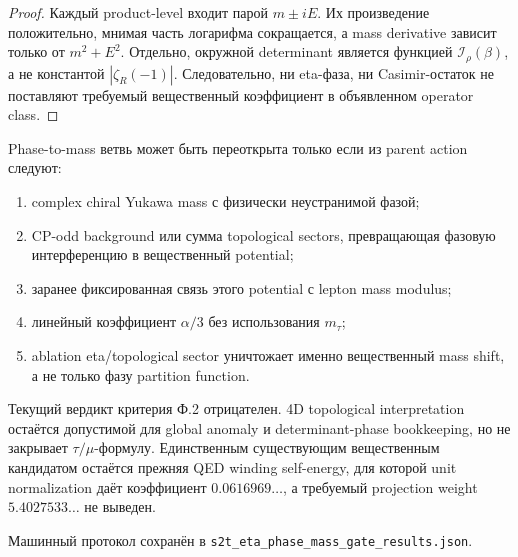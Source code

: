 \begin{proof}
Каждый product-level входит парой \(m\pm iE\). Их произведение положительно,
мнимая часть логарифма сокращается, а mass derivative зависит только от
\(m^2+E^2\). Отдельно, окружной determinant является функцией
\(\mathcal I_\rho(\beta)\), а не константой \(|\zeta_R(-1)|\). Следовательно,
ни eta-фаза, ни Casimir-остаток не поставляют требуемый вещественный
коэффициент в объявленном operator class.
\end{proof}

\begin{protocol}
Phase-to-mass ветвь может быть переоткрыта только если из parent action
следуют:
\begin{enumerate}
 \item complex chiral Yukawa mass с физически неустранимой фазой;
 \item CP-odd background или сумма topological sectors, превращающая
 фазовую интерференцию в вещественный potential;
 \item заранее фиксированная связь этого potential с lepton mass modulus;
 \item линейный коэффициент \(\alpha/3\) без использования \(m_\tau\);
 \item ablation eta/topological sector уничтожает именно вещественный mass
 shift, а не только фазу partition function.
\end{enumerate}
\end{protocol}

Текущий вердикт критерия Ф.2 отрицателен. 4D topological interpretation
остаётся допустимой для global anomaly и determinant-phase bookkeeping, но
не закрывает \(\tau/\mu\)-формулу. Единственным существующим вещественным
кандидатом остаётся прежняя QED winding self-energy, для которой unit
normalization даёт коэффициент \(0.0616969\ldots\), а требуемый projection
weight \(5.4027533\ldots\) не выведен.

Машинный протокол сохранён в
\texttt{s2t\_eta\_phase\_mass\_gate\_results.json}.